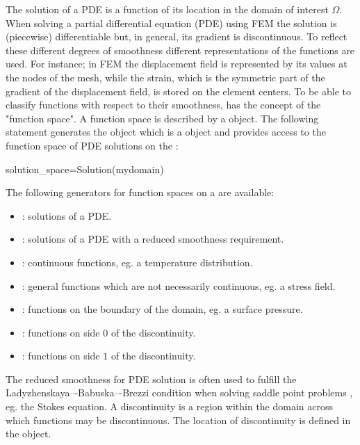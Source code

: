 The solution of a PDE is a function of its location in the domain of interest $\Omega$. 
When solving a partial differential equation  (PDE) using FEM
the solution is (piecewise) differentiable but, in general, its gradient
is discontinuous. To reflect these different degrees of smoothness different
representations of the functions are used. For instance; in FEM
the displacement field is represented by its values at the nodes of the mesh, while the 
strain, which is the symmetric part of the gradient of the displacement field, is stored on the 
element centers. To be able to classify functions with respect to their smoothness, \escript has the
concept of the "function space". A function space is described by a \FunctionSpace object.
The following statement generates the object  which is 
a \FunctionSpace object and provides access to the function space of 
PDE solutions on the \Domain {}:
\begin{python}
solution_space=Solution(mydomain)
\end{python}
The following generators for function spaces on a \Domain {} are available: 
\begin{itemize}
\item {}: solutions of a PDE.
\item {}: solutions of a PDE with a reduced smoothness requirement.  
\item {}: continuous functions, eg. a temperature distribution.
\item {}: general functions which are not necessarily continuous, eg. a stress field.
\item {}: functions on the boundary of the domain, eg. a surface pressure.
\item {}: functions on side $0$ of the discontinuity. 
\item {}: functions on side $1$ of the discontinuity.
\end{itemize}
The reduced smoothness for PDE solution is often used to fulfill the Ladyzhenskaya–-Babuska–-Brezzi condition \cite{LBB} when 
solving saddle point problems , eg. the Stokes equation.
A discontinuity  is a region within the domain across which functions may be discontinuous.  
The location of discontinuity is defined in the \Domain object.
